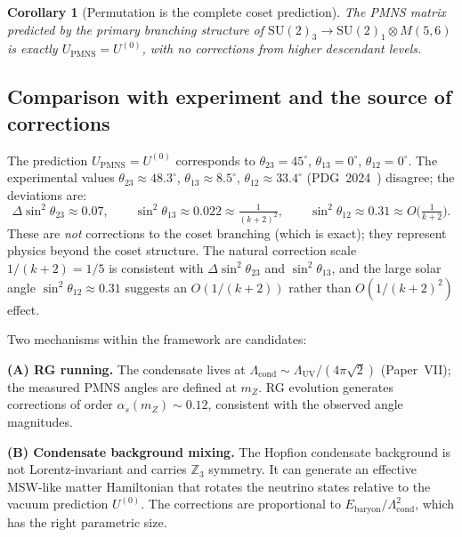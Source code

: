 \documentclass[11pt,a4paper]{article}
\newtheorem{corollary}[theorem]{Corollary}
\theoremstyle{definition}\newtheorem{definition}[theorem]{Definition}
\theoremstyle{remark}
\newcommand{\SU}{\mathrm{SU}}
\begin{document}
\begin{corollary}[Permutation is the complete coset prediction]
\label{P17:cor:pmns_exact}
The PMNS matrix predicted by the primary branching structure of
$\SU(2)_3\to\SU(2)_1\otimes M(5,6)$ is exactly
$U_{\mathrm{PMNS}}=U^{(0)}$, with no corrections from higher
descendant levels.
\end{corollary}

\subsection{Comparison with experiment and the source of corrections}

\label{P17:sec:pmns_corrections}

The prediction $U_{\mathrm{PMNS}}=U^{(0)}$ corresponds to
$\theta_{23}=45^\circ$, $\theta_{13}=0^\circ$, $\theta_{12}=0^\circ$.
The experimental values $\theta_{23}\approx48.3^\circ$,
$\theta_{13}\approx8.5^\circ$, $\theta_{12}\approx33.4^\circ$
(PDG~2024~\cite{PDG2024}) disagree; the deviations are:
\begin{equation}
  \Delta\sin^2\theta_{23} \approx 0.07,
  \qquad
  \sin^2\theta_{13} \approx 0.022 \approx \tfrac{1}{(k+2)^2},
  \qquad
  \sin^2\theta_{12} \approx 0.31 \approx O\!\bigl(\tfrac{1}{k+2}\bigr).
  \label{P17:eq:pmns_discrepancy}
\end{equation}
These are \emph{not} corrections to the coset branching (which is
exact); they represent physics beyond the coset structure.
The natural correction scale $1/(k+2)=1/5$ is consistent with
$\Delta\sin^2\theta_{23}$ and $\sin^2\theta_{13}$, and the large
solar angle $\sin^2\theta_{12}\approx0.31$ suggests an $O(1/(k+2))$
rather than $O(1/(k+2)^2)$ effect.

Two mechanisms within the framework are candidates:

\textbf{(A) RG running.}  The condensate lives at
$\Lambda_{\mathrm{cond}}\sim\Lambda_{\mathrm{UV}}/(4\pi\sqrt{2})$
(Paper~VII); the measured PMNS angles are defined at $m_Z$.
RG evolution generates corrections of order $\alpha_s(m_Z)\sim0.12$,
consistent with the observed angle magnitudes.

\textbf{(B) Condensate background mixing.}  The Hopfion condensate
background is not Lorentz-invariant and carries $\mathbb{Z}_3$ symmetry.
It can generate an effective MSW-like matter Hamiltonian that rotates
the neutrino states relative to the vacuum prediction $U^{(0)}$.
The corrections are proportional to
$E_{\mathrm{baryon}}/\Lambda_{\mathrm{cond}}^2$, which has the right
parametric size.
\end{document}
